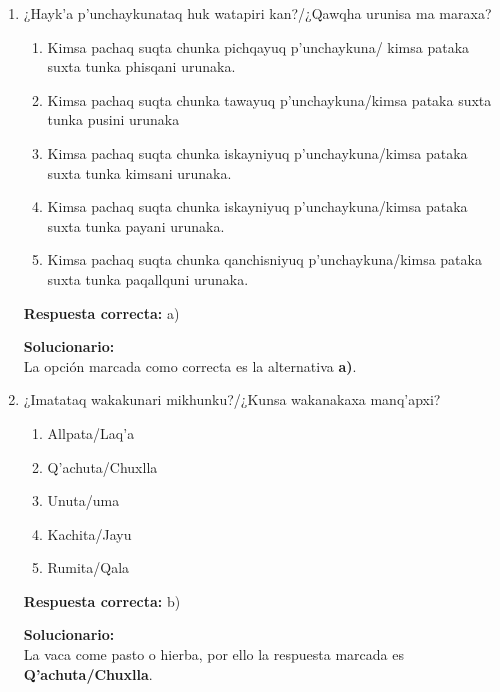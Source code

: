 \begin{enumerate}

	
	\item ¿Hayk’a p’unchaykunataq huk watapiri kan?/¿Qawqha urunisa ma maraxa?
	\begin{enumerate}[label=\alph*)]
		\item Kimsa pachaq suqta chunka pichqayuq p’unchaykuna/ kimsa pataka suxta tunka phisqani urunaka.
		\item Kimsa pachaq suqta chunka tawayuq p’unchaykuna/kimsa pataka suxta tunka pusini urunaka
		\item Kimsa pachaq suqta chunka iskayniyuq p’unchaykuna/kimsa pataka suxta tunka kimsani urunaka.
		\item Kimsa pachaq suqta chunka iskayniyuq p’unchaykuna/kimsa pataka suxta tunka payani urunaka.
		\item Kimsa pachaq suqta chunka qanchisniyuq p’unchaykuna/kimsa pataka suxta tunka paqallquni urunaka.
	\end{enumerate}
	\textbf{Respuesta correcta:} a)
	
	\vspace{2mm}
	\textbf{Solucionario:}\\
	La opción marcada como correcta es la alternativa \textbf{a)}.
	
	\vspace{6mm}
	
	\item ¿Imatataq wakakunari mikhunku?/¿Kunsa wakanakaxa manq’apxi?
	\begin{enumerate}[label=\alph*)]
		\item Allpata/Laq’a
		\item Q’achuta/Chuxlla
		\item Unuta/uma
		\item Kachita/Jayu
		\item Rumita/Qala
	\end{enumerate}
	\textbf{Respuesta correcta:} b)
	
	\vspace{2mm}
	\textbf{Solucionario:}\\
	La vaca come pasto o hierba, por ello la respuesta marcada es \textbf{Q’achuta/Chuxlla}.
	
	\vspace{6mm}
	
\end{enumerate}





